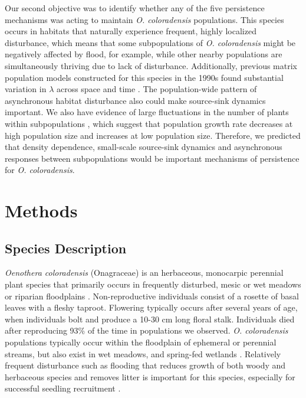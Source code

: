 \documentclass[12pt, letterpaper]{article}
\begin{document}
Our second objective was to identify whether any of the five persistence mechanisms was acting to maintain \textit{O. coloradensis} populations. This species occurs in habitats that naturally experience frequent, highly localized disturbance, which means that some subpopulations of \textit{O. coloradensis} might be negatively affected by flood, for example, while other nearby populations are simultaneously thriving due to lack of disturbance. Additionally, previous matrix population models constructed for this species in the 1990s found substantial variation in $\lambda$ across space and time \cite{Floyd1998}. The population-wide pattern of asynchronous habitat disturbance also could make source-sink dynamics important. We also have evidence of large fluctuations in the number of plants within subpopulations \cite{Heidel202133-YearWyoming}, which suggest that population growth rate decreases at high population size and increases at low population size. Therefore, we predicted that density dependence, small-scale source-sink dynamics and asynchronous responses between subpopulations would be important mechanisms of persistence for \textit{O. coloradensis}.  

\section{Methods}

\subsection{Species Description}  
\textit{Oenothera coloradensis} (Onagraceae) \cite{Wagner2013-ii} is an herbaceous, monocarpic perennial plant species that primarily occurs in frequently disturbed, mesic or wet meadows or riparian floodplains
\cite{Fertig2000-ow}. Non-reproductive individuals consist of a rosette of basal leaves with a fleshy taproot. Flowering typically occurs after several years of age, when individuals bolt and produce a 10-30 cm long floral stalk. Individuals died after reproducing 93\% of the time in populations we observed. \textit{O. coloradensis} populations typically occur within the floodplain of ephemeral or perennial streams, but also exist in wet meadows, and spring-fed wetlands \cite{Fertig2000-ow}. Relatively frequent disturbance such as flooding that reduces growth of both woody and herbaceous species and removes litter is important for this species, especially for successful seedling recruitment \cite{Fertig2000-ow, Burgess2003}. 
\end{document}
